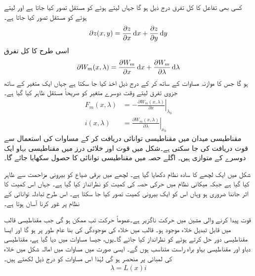 کسی بھی تفاعل  کا کل تفرق درج ذیل ہو گا جہاں  لیتے ہوئے  کو مستقل تصور کیا جاتا ہے اور  لیتے ہوئے  کو مستقل تصور کیا جاتا ہے۔
\begin{align}\label{مساوات_تبادلہ_جزوی_تفرق_عمومی_الف}
\partial z(x,y)=\frac{\partial z}{\partial x} \dif x+\frac{\partial z}{\partial y} \dif y
\end{align}
اسی طرح  کا کل تفرق
\begin{align}\label{مساوات_تبادلہ_جزوی_تفرق_عمومی_ب}
\partial W_m(x,\lambda)=\frac{\partial W_m}{\partial x}\dif x+\frac{\partial W_m}{\partial \lambda}\dif \lambda
\end{align}
ہو گا جس کا موازنہ مساوات  کے ساتھ کر کے درج ذیل اخذ  کیا جا سکتا ہے جہاں ایک متغیر کے ساتھ جزوی تفرق لیتے وقت دوسرے متغیر  کو صریحاً مستقل ظاہر کیا گیا ہے۔
\begin{align}
F_m(x,\lambda)&=-\left. \frac{\partial W_m(x,\lambda)}{\partial x}\right|_{\lambda_0}\label{مساوات_تبادلہ_توانائی_قوت_برقی_رو}\\
i(x,\lambda)&=\left. \frac{\partial W_m(x,\lambda)}{\partial \lambda}\right|_{x_0}\label{مساوات_تبادلہ_توانائی_سے_رو}
\end{align}
مقناطیسی میدان میں مقناطیسی توانائی  دریافت کر کے مساوات   کی  استعمال سے قوت  دریافت کی جا سکتی ہے۔شکل  میں قوت اور خلائی درز میں مقناطیسی بہاو ایک دوسرے کے متوازی ہیں۔ اگلے حصہ میں مقناطیسی توانائی کا حصول سکھایا جائے گا۔

شکل   میں  ایک لچھے کا سادہ نظام دکھایا گیا ہے۔ لچھے میں برقی ضیاع کو بیرونی مزاحمت سے ظاہر کیا گیا ہے جبکہ میکانی نظام میں حرکی حصہ کی کمیت کو نظرانداز کیا گیا ہے۔ جہاں اس کمیت  کا اثر جاننا ضروری ہو وہاں  اس کو ایک بیرونی کمیت تصور کیا جا سکتا ہے۔ اس طرح تبادلہ توانائی کے نظام پر غور کرنا آسان ہوتا ہے۔ 

قوت پیدا کرنے والی مشین میں حرکت ناگزیر ہے۔عموماً حرکت تب ممکن ہو گی جب مقناطیسی قالب میں قابل تبدیل خلاء موجود ہو۔ قالب میں خلاء کی موجودگی کی بنا عام طور  پر  ہو گا اور ایسا  مقناطیسی دور حل کرتے ہوئے  کو نظرانداز کیا جائے گا۔یوں، جیسا مساوات   میں دیا گیا ہے،  مقناطیسی دباو  اور مقناطیسی بہاو   براہ راست متناسب ہوں گے۔ ایسی صورت میں مساوات   میں  امالہ  شکل    میں خلاء کی لمبائی   پر منحصر ہو گی لہٰذا اس مساوات کو درج ذیل لکھتے ہیں۔
\begin{align}\label{مساوات_تبادلہ_ارتباط_بہاو_اور_امالہ}
\lambda=L(x) i
\end{align}

